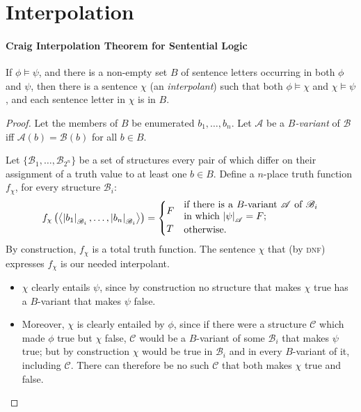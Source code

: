 \section{Interpolation}


\paragraph{Craig Interpolation Theorem for Sentential Logic}

\begin{theorem}\label{thmcraig}If $\phi 
\vDash \psi$, and there is a non-empty set $B$ of sentence letters occurring in both $\phi$ and
$\psi$, then there is a sentence $\chi$ (an \emph{interpolant}) such that both $\phi \vDash \chi$ and
$\chi \vDash \psi$, and each sentence letter in $\chi$ is in $B$. \end{theorem}
\begin{proof} Let the members of $B$ be enumerated $b_{1},\ldots,b_{n}$.
Let $\mathscr{A}$ be a \emph{$B$-variant} of $\mathscr{B}$ iff $\mathscr{A}(b)=\mathscr{B}(b)$ for all $b\in B$. 

 Let $\{\mathscr{B}_{1},\ldots,\mathscr{B}_{2^{n}}\}$ be a set of structures every pair of which differ on their assignment of a truth value to at least one $b \in B$. Define a $n$-place truth function $f_{\chi}$, for every structure $\mathscr{B}_{i}$: \begin{equation*}
f_{\chi}\left(\left\langle\left|{b_{1}}\right|_{\mathscr{B}_{i}},\ldots,\left|{b_{n}}\right|_{\mathscr{B}_{i}}\right\rangle\right) =
 	 \begin{cases} F & \parbox[c]{.4\textwidth}{if there is a $B$-variant $\mathscr{A}$ of $\mathscr{B}_{i}$ in which $\val{\psi}{A}=F$;}\\
T & \parbox[c]{.4\textwidth}{otherwise.}\end{cases}
 \end{equation*}
 By construction, $f_{\chi}$ is a total truth function. 
The sentence $\chi$ that (by \textsc{\lowercase{DNF}}) expresses $f_{\chi}$ is our needed interpolant.
\begin{itemize}
	\item $\chi$ clearly 
	entails $\psi$, since by construction no structure that makes $\chi$ true has a $B$-variant that makes $\psi$ false.
	\item  Moreover, $\chi$ is clearly entailed by $\phi$,
	since if there were a structure $\mathscr{C}$ which made $\phi$ true but $\chi$
	false,  $\mathscr{C}$ would be a $B$-variant of some $\mathscr{B}_{i}$ that makes
	$\psi$ true; but by construction $\chi$ would be true in $\mathscr{B}_{i}$
	and in every $B$-variant of it, including  $\mathscr{C}$. There can
	therefore be no such  $\mathscr{C}$ that both makes $\chi$ true and false.
\end{itemize}  \end{proof}

